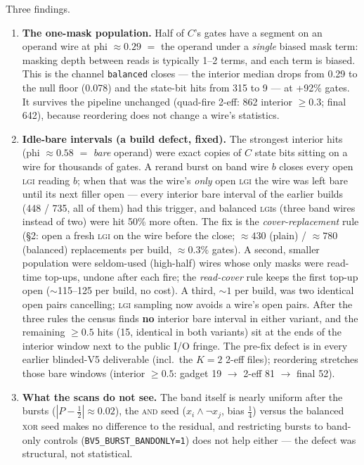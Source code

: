 \documentclass[11pt]{article}
\newcommand{\doc}[1]{\texttt{#1}}
\newcommand{\lgi}{\textsc{lgi}}
\begin{document}
Three findings.
\begin{enumerate}
\item \textbf{The one-mask population.} Half of $C$'s gates have a segment on an
  operand wire at phi ${\approx}0.29$ $=$ the operand under a \emph{single} biased
  mask term: masking depth between reads is typically 1--2 terms, and each term is
  biased. This is the channel \doc{balanced} closes --- the interior median drops
  from 0.29 to the null floor (0.078) and the state-bit hits from 315 to 9 --- at
  +92\% gates. It survives the pipeline unchanged (quad-fire 2-eff: 862 interior
  $\ge0.3$; final 642), because reordering does not change a wire's statistics.
\item \textbf{Idle-bare intervals (a build defect, fixed).} The strongest interior
  hits (phi ${\approx}0.58$ $=$ \emph{bare} operand) were exact copies of $C$ state
  bits sitting on a wire for thousands of gates. A rerand burst on band wire $b$
  closes every open \lgi{} reading $b$; when that was the wire's \emph{only} open
  \lgi{} the wire was left bare until its next filler open --- every interior bare
  interval of the earlier builds (448 / 735, all of them) had this trigger, and
  balanced \lgi s (three band wires instead of two) were hit 50\% more often. The
  fix is the \emph{cover-replacement} rule (\S2: open a fresh \lgi{} on the wire
  before the close; ${\approx}430$ (plain) / ${\approx}780$ (balanced) replacements per build, ${\approx}0.3\%$ gates).
  A second, smaller population were seldom-used (high-half) wires whose only masks
  were read-time top-ups, undone after each fire; the \emph{read-cover} rule keeps
  the first top-up open (${\sim}$115--125 per build, no cost). A third, ${\sim}1$ per
  build, was two identical open pairs cancelling; \lgi{} sampling now avoids a
  wire's open pairs. After the three rules the census finds \textbf{no} interior
  bare interval in either variant, and the remaining $\ge0.5$ hits (15, identical
  in both variants) sit at the ends of the interior window next to the public I/O
  fringe. The pre-fix defect is in every earlier blinded-V5 deliverable (incl.\ the
  $K{=}2$ 2-eff files); reordering stretches those bare windows (interior $\ge0.5$:
  gadget 19 $\to$ 2-eff 81 $\to$ final 52).
\item \textbf{What the scans do not see.} The band itself is nearly uniform after
  the bursts ($|P-\tfrac12| \approx 0.02$), the \textsc{and} seed ($x_i \wedge \neg x_j$,
  bias $\tfrac14$) versus the balanced \textsc{xor} seed makes no difference to the
  residual, and restricting bursts to band-only controls
  (\doc{BV5\_BURST\_BANDONLY=1}) does not help either --- the defect was structural,
  not statistical.
\end{enumerate}
\end{document}
